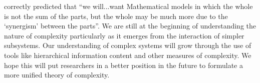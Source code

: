 \citet[chap. 23]{hamming1997art} correctly predicted that ``we will...want
Mathematical models in which the whole is not the sum of the parts, but the
whole may be much more due to the `synergism' between the parts''. We are still
at the beginning of understanding the nature of complexity particularly as it
emerges from the interaction of simpler subsystems. Our understanding of
complex systems will grow through the use of tools like hierarchical
information content and other measures of complexity. We hope this will put
researchers in a better position in the future to formulate a more unified
theory of complexity.
